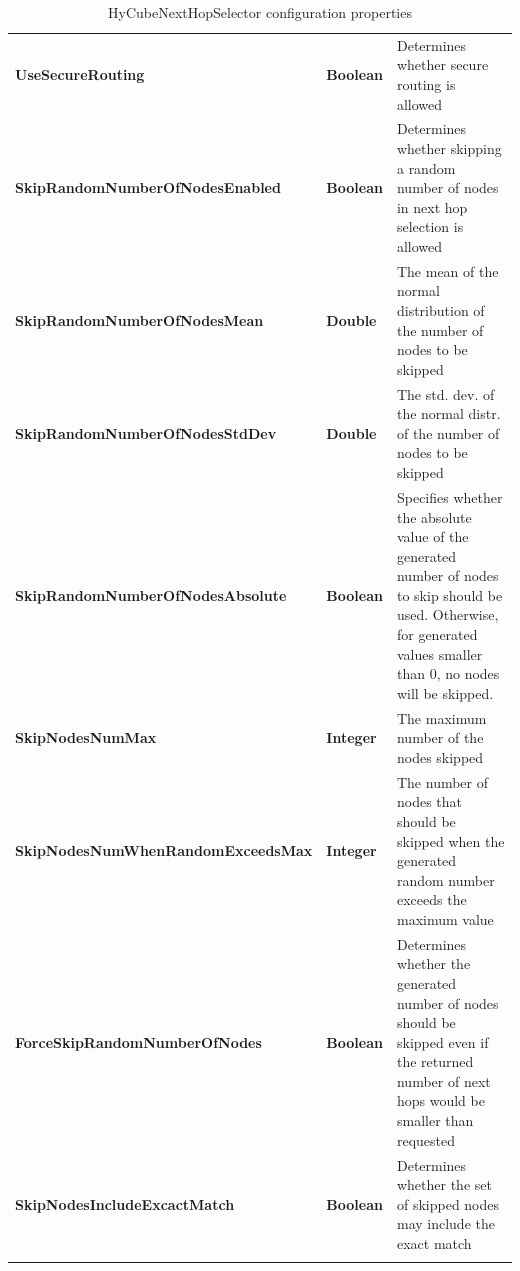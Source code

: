 \begin{center}
\begin{longtable}{p{5.0cm} p{1.0cm} p{8.5cm}}
	\textbf{UseSecureRouting}								& \textbf{Boolean}		& Determines whether secure routing is allowed							\\[1.5mm]
	\textbf{SkipRandomNumberOfNodesEnabled}					& \textbf{Boolean}		& Determines whether skipping a random number of nodes in next hop selection is allowed			\\[1.5mm]
	\textbf{SkipRandomNumberOfNodesMean}					& \textbf{Double}		& The mean of the normal distribution of the number of nodes to be skipped							\\[1.5mm]
	\textbf{SkipRandomNumberOfNodesStdDev}					& \textbf{Double}		& The std. dev. of the normal distr. of the number of nodes to be skipped			\\[1.5mm]
	\textbf{SkipRandomNumberOfNodesAbsolute}				& \textbf{Boolean}		& Specifies whether the absolute value of the generated number of nodes to skip should be used. Otherwise, for generated values smaller than 0, no nodes will be skipped.					\\[1.5mm]
	\textbf{SkipNodesNumMax}								& \textbf{Integer}		& The maximum number of the nodes skipped															\\[1.5mm]
	\textbf{SkipNodesNumWhenRandomExceedsMax}				& \textbf{Integer}		& The number of nodes that should be skipped when the generated random number exceeds the maximum value			\\[1.5mm]
	\textbf{ForceSkipRandomNumberOfNodes}					& \textbf{Boolean}		& Determines whether the generated number of nodes should be skipped even if the returned number of next hops would be smaller than requested				\\[1.5mm]
	\textbf{SkipNodesIncludeExcactMatch}					& \textbf{Boolean}		& Determines whether the set of skipped nodes may include the exact match			\\[1.5mm]
    \hline
\caption{HyCubeNextHopSelector configuration properties}
\label{tab:libPropHyCubeNextHopSelector}
\end{longtable}
\end{center}


